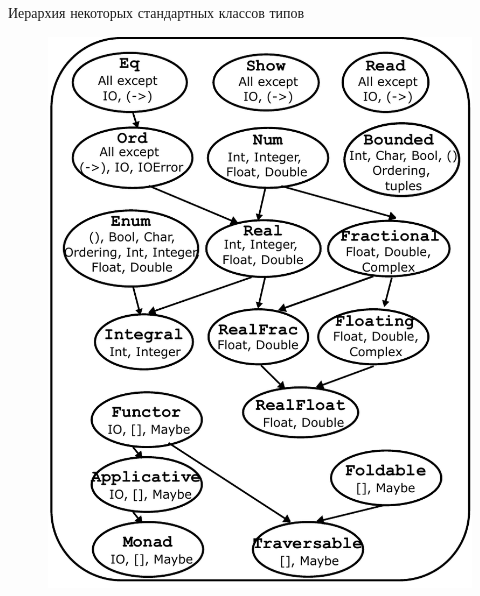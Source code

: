 \documentclass{beamer}
\begin{document}
  \begin{frame}{Иерархия некоторых стандартных классов типов}
      \begin{figure}
          \centering
          \includegraphics[scale=0.45]{media/base-classes.pdf}
      \end{figure}
  \end{frame}
\end{document}
